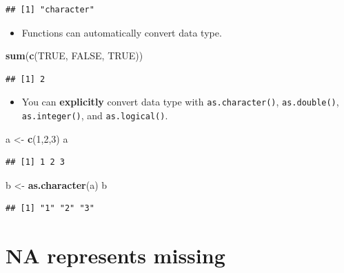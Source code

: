 \documentclass[]{book}
\newenvironment{Shaded}{\begin{snugshade}}{\end{snugshade}}
\newcommand{\KeywordTok}[1]{\textcolor[rgb]{0.13,0.29,0.53}{\textbf{{#1}}}}
\newcommand{\DecValTok}[1]{\textcolor[rgb]{0.00,0.00,0.81}{{#1}}}
\newcommand{\StringTok}[1]{\textcolor[rgb]{0.31,0.60,0.02}{{#1}}}
\newcommand{\OtherTok}[1]{\textcolor[rgb]{0.56,0.35,0.01}{{#1}}}
\newcommand{\NormalTok}[1]{{#1}}
\providecommand{\tightlist}{%
  \setlength{\itemsep}{0pt}\setlength{\parskip}{0pt}}
\begin{document}
\begin{verbatim}
## [1] "character"
\end{verbatim}

\begin{itemize}
\tightlist
\item
  Functions can automatically convert data type.
\end{itemize}

\begin{Shaded}
\begin{Highlighting}[]
\KeywordTok{sum}\NormalTok{(}\KeywordTok{c}\NormalTok{(}\OtherTok{TRUE}\NormalTok{, }\OtherTok{FALSE}\NormalTok{, }\OtherTok{TRUE}\NormalTok{))}
\end{Highlighting}
\end{Shaded}

\begin{verbatim}
## [1] 2
\end{verbatim}

\begin{itemize}
\tightlist
\item
  You can \textbf{explicitly} convert data type with
  \texttt{as.character()}, \texttt{as.double()}, \texttt{as.integer()},
  and \texttt{as.logical()}.
\end{itemize}

\begin{Shaded}
\begin{Highlighting}[]
\NormalTok{a <-}\StringTok{ }\KeywordTok{c}\NormalTok{(}\DecValTok{1}\NormalTok{,}\DecValTok{2}\NormalTok{,}\DecValTok{3}\NormalTok{)}
\NormalTok{a}
\end{Highlighting}
\end{Shaded}

\begin{verbatim}
## [1] 1 2 3
\end{verbatim}

\begin{Shaded}
\begin{Highlighting}[]
\NormalTok{b <-}\StringTok{ }\KeywordTok{as.character}\NormalTok{(a)}
\NormalTok{b}
\end{Highlighting}
\end{Shaded}

\begin{verbatim}
## [1] "1" "2" "3"
\end{verbatim}

\section{NA represents missing}\label{na-represents-missing}
\end{document}
